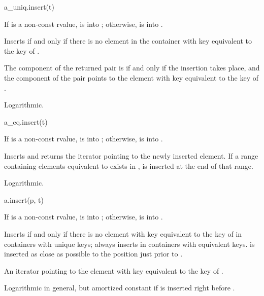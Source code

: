 %
\begin{itemdecl}
a_uniq.insert(t)
\end{itemdecl}

\begin{itemdescr}
\pnum
\result
{}

\pnum
\expects
If  is a non-const rvalue,
 is  into ;
otherwise,  is  into .

\pnum
\effects
Inserts  if and only if there is no element in the container
with key equivalent to the key of .

\pnum
\returns
The  component of the returned pair is 
if and only if the insertion takes place, and
the  component of the pair points to
the element with key equivalent to the key of .

\pnum
\complexity
Logarithmic.
\end{itemdescr}

%
\begin{itemdecl}
a_eq.insert(t)
\end{itemdecl}

\begin{itemdescr}
\pnum
\result
{}

\pnum
\expects
If  is a non-const rvalue,
 is  into ;
otherwise,  is  into .

\pnum
\effects
Inserts  and returns the iterator pointing to
the newly inserted element.
If a range containing elements equivalent to  exists in ,
 is inserted at the end of that range.

\pnum
\complexity
Logarithmic.
\end{itemdescr}

%
\begin{itemdecl}
a.insert(p, t)
\end{itemdecl}

\begin{itemdescr}
\pnum
\result
{}

\pnum
\expects
If  is a non-const rvalue,
 is  into ;
otherwise,  is  into .

\pnum
\effects
Inserts  if and only if there is no element
with key equivalent to the key of  in containers with unique keys;
always inserts  in containers with equivalent keys.
 is inserted as close as possible to
the position just prior to .

\pnum
\returns
An iterator pointing to the element with key equivalent to the key of .

\pnum
\complexity
Logarithmic in general, but
amortized constant if  is inserted right before .
\end{itemdescr}

